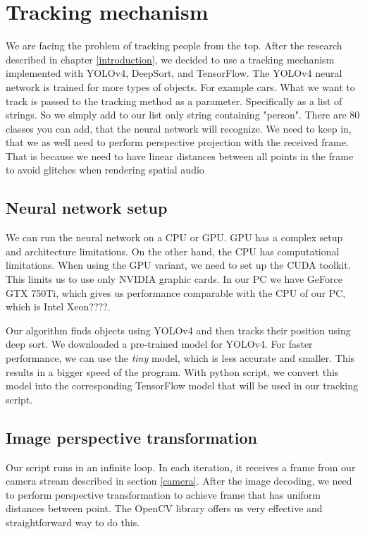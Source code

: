 \documentclass{ctuthesis}
\begin{document}
\section{Tracking mechanism}
We are facing the problem of tracking people from the top. After the research described in chapter  \ref{introduction}, we decided to use a tracking mechanism implemented with YOLOv4, DeepSort, and TensorFlow. The YOLOv4 neural network is trained for more types of objects. For example cars. What we want to track is passed to the tracking method as a parameter. Specifically as a list of strings. So we simply add to our list only string containing "person". There are 80 classes you can add, that the neural network will recognize. We need to keep in, that we as well need to perform perspective projection with the received frame. That is because we need to have linear distances between all points in the frame to avoid glitches when rendering spatial audio

\subsection{Neural network setup}
We can run the neural network on a CPU or GPU. GPU has a complex setup and architecture limitations. On the other hand, the CPU has computational limitations. When using the GPU variant, we need to set up the CUDA toolkit. This limits us to use only NVIDIA graphic cards. In our PC we have GeForce GTX 750Ti, which gives us performance comparable with the CPU of our PC, which is Intel Xeon????. 

Our algorithm finds objects using YOLOv4 and then tracks their position using deep sort. We downloaded a pre-trained model for YOLOv4\cite{96}. For faster performance, we can use the \textit{tiny} model, which is less accurate and smaller. This results in a bigger speed of the program. With python script, we convert this model into the corresponding TensorFlow model that will be used in our tracking script.

\subsection{Image perspective transformation}
Our script runs in an infinite loop. In each iteration, it receives a frame from our camera stream described in section \ref{camera}. After the image decoding, we need to perform perspective transformation to achieve frame that has uniform distances between point. The OpenCV library offers us very effective and straightforward way to do this. 
\end{document}
